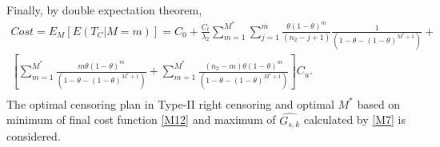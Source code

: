 \documentclass[twoside]{article}
\begin{document}
Finally,  by double expectation theorem, 
\begin{eqnarray}\label{M12}\nonumber
Cost=E_M\left[E(T_C|M=m)\right]=C_0+\frac{C_t}{\lambda_2}\sum_{m=1}^{M^*} \sum_{j=1}^m\frac{\theta(1-\theta)^m}{\left(n_2-j+1\right)}\frac{1}{(1-\theta-(1-\theta)^{M^*+1})}  +\\ \nonumber \left[\sum_{m=1}^{M^*}\frac{m\theta(1-\theta)^m}{(1-\theta-(1-\theta)^{M^*+1})}    +\sum_{m=1}^{M^*}\frac{(n_2-m)\theta(1-\theta)^m}{(1-\theta-(1-\theta)^{M^*+1})}\right]C_u.\\
\end{eqnarray}
The optimal censoring plan in Type-II right censoring and optimal $M^*$ based on  minimum of final cost function \eqref{M12} and maximum   of $\widehat{G_{s,k}}$ calculated by  \eqref{M7} is considered.
\end{document}
